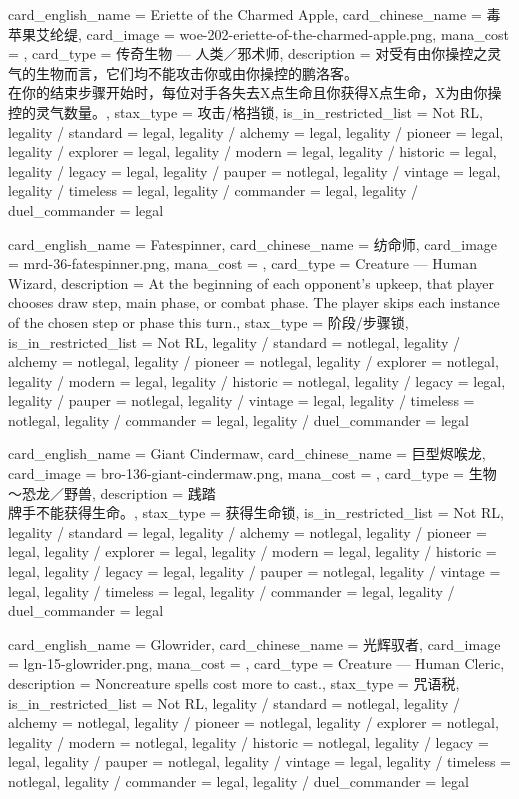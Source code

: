 \documentclass[lang = cn, color = black, 10pt]{AllThatStax}
\begin{document}
\card
{
	card_english_name = {Eriette of the Charmed Apple},
	card_chinese_name = {毒苹果艾纶缇},
	card_image = woe-202-eriette-of-the-charmed-apple.png,
	mana_cost = ,
	card_type = 传奇生物 — 人类／邪术师,
	description = {对受有由你操控之灵气的生物而言，它们均不能攻击你或由你操控的鹏洛客。\\
		在你的结束步骤开始时，每位对手各失去X点生命且你获得X点生命，X为由你操控的灵气数量。},
	stax_type = 攻击/格挡锁,
	is_in_restricted_list = Not RL,
	legality / standard = legal,
	legality / alchemy = legal,
	legality / pioneer = legal,
	legality / explorer = legal,
	legality / modern = legal,
	legality / historic = legal,
	legality / legacy = legal,
	legality / pauper = notlegal,
	legality / vintage = legal,
	legality / timeless = legal,
	legality / commander = legal,
	legality / duel_commander = legal
}

\card
{
	card_english_name = {Fatespinner},
	card_chinese_name = {纺命师},
	card_image = mrd-36-fatespinner.png,
	mana_cost = ,
	card_type = Creature — Human Wizard,
	description = {At the beginning of each opponent's upkeep, that player chooses draw step, main phase, or combat phase. The player skips each instance of the chosen step or phase this turn.},
	stax_type = 阶段/步骤锁,
	is_in_restricted_list = Not RL,
	legality / standard = notlegal,
	legality / alchemy = notlegal,
	legality / pioneer = notlegal,
	legality / explorer = notlegal,
	legality / modern = legal,
	legality / historic = notlegal,
	legality / legacy = legal,
	legality / pauper = notlegal,
	legality / vintage = legal,
	legality / timeless = notlegal,
	legality / commander = legal,
	legality / duel_commander = legal
}

\card
{
	card_english_name = {Giant Cindermaw},
	card_chinese_name = {巨型烬喉龙},
	card_image = bro-136-giant-cindermaw.png,
	mana_cost = ,
	card_type = 生物 ～恐龙／野兽,
	description = {践踏\\
		牌手不能获得生命。},
	stax_type = 获得生命锁,
	is_in_restricted_list = Not RL,
	legality / standard = legal,
	legality / alchemy = notlegal,
	legality / pioneer = legal,
	legality / explorer = legal,
	legality / modern = legal,
	legality / historic = legal,
	legality / legacy = legal,
	legality / pauper = notlegal,
	legality / vintage = legal,
	legality / timeless = legal,
	legality / commander = legal,
	legality / duel_commander = legal
}

\card
{
	card_english_name = {Glowrider},
	card_chinese_name = {光辉驭者},
	card_image = lgn-15-glowrider.png,
	mana_cost = ,
	card_type = Creature — Human Cleric,
	description = {Noncreature spells cost  more to cast.},
	stax_type = 咒语税,
	is_in_restricted_list = Not RL,
	legality / standard = notlegal,
	legality / alchemy = notlegal,
	legality / pioneer = notlegal,
	legality / explorer = notlegal,
	legality / modern = notlegal,
	legality / historic = notlegal,
	legality / legacy = legal,
	legality / pauper = notlegal,
	legality / vintage = legal,
	legality / timeless = notlegal,
	legality / commander = legal,
	legality / duel_commander = legal
}
\end{document}
